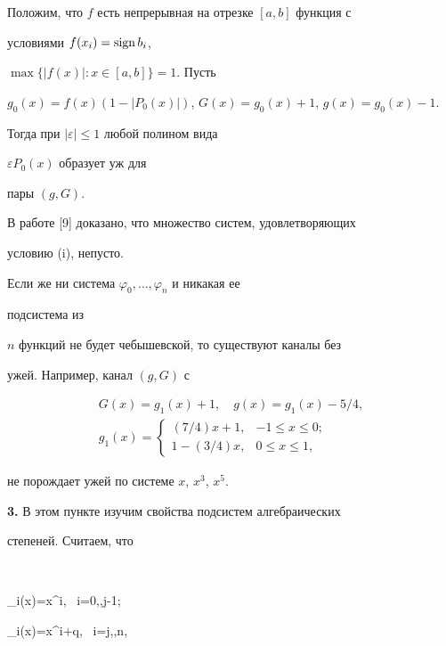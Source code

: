  


Положим, что $f$ есть непрерывная на отрезке $[a,b]$ функция с 


условиями $f(x_i)=\operatorname{sign} b_i$, 


$\max\{|f(x)|:x\in[a,b]\}=1$. Пусть 


$g_0(x)=f(x)(1-|P_0(x)|)$, $G(x)=g_0(x)+1$, $g(x)=g_0(x)-1$. 


Тогда при $|\varepsilon|\le 1$ любой полином вида 


$\varepsilon P_0(x)$ образует уж для 


пары $(g,G)$. 


 


В работе [9] доказано, что множество систем, удовлетворяющих 


условию (i), непусто. 


 


Если же ни система $\varphi_0,\dotsc,\varphi_n$ и никакая ее 


подсистема из 


$n$ функций не будет чебышевской, то существуют каналы без 


ужей. Например, канал $(g,G)$ с 


\begin{gather*} 


G(x)=g_1(x)+1,\quad g(x)=g_1(x)-5/4, \\ 


g_1(x)= 


\begin{cases} 


(7/4)x+1, & -1\le x\le 0;\\ 


1-(3/4)x, & 0\le x\le 1, 


\end{cases} 


\end{gather*} 


не порождает ужей по системе $x$, $x^3$, $x^5$. 


\medskip 


 


{\bf 3.} В этом пункте изучим свойства подсистем алгебраических 


степеней. Считаем, что 


$$ 


\varphi_i(x)=x^i,\ \; i=0,\dotsc,j-1;\quad 


\varphi_i(x)=x^{i+q},\ \; i=j,\dotsc,n, 



